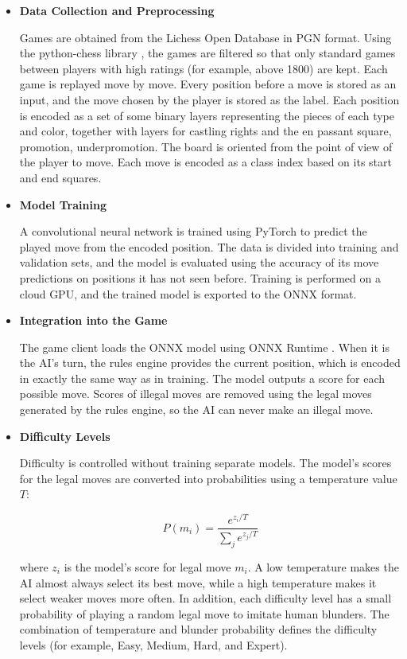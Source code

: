 \begin{itemize}[leftmargin=1.5em]
\item\textbf{Data Collection and Preprocessing}

Games are obtained from the Lichess Open Database in PGN format. Using the python-chess library \cite{pythonchess}, the games are filtered so that only standard games between players with high ratings (for example, above 1800) are kept. Each game is replayed move by move. Every position before a move is stored as an input, and the move chosen by the player is stored as the label. Each position is encoded as a set of some binary layers representing the pieces of each type and color, together with layers for castling rights and the en passant square, promotion, underpromotion. The board is oriented from the point of view of the player to move. Each move is encoded as a class index based on its start and end squares.

\item\textbf{Model Training}

A convolutional neural network is trained using PyTorch \cite{pytorch} to predict the played move from the encoded position. The data is divided into training and validation sets, and the model is evaluated using the accuracy of its move predictions on positions it has not seen before. Training is performed on a cloud GPU, and the trained model is exported to the ONNX format.

\item\textbf{Integration into the Game}

The game client loads the ONNX model using ONNX Runtime \cite{onnxruntime}. When it is the AI's turn, the rules engine provides the current position, which is encoded in exactly the same way as in training. The model outputs a score for each possible move. Scores of illegal moves are removed using the legal moves generated by the rules engine, so the AI can never make an illegal move.

\item\textbf{Difficulty Levels}

Difficulty is controlled without training separate models. The model's scores for the legal moves are converted into probabilities using a temperature value $T$:

\begin{equation}
P(m_i) = \frac{e^{z_i / T}}{\sum_j e^{z_j / T}}
\end{equation}

where $z_i$ is the model's score for legal move $m_i$. A low temperature makes the AI almost always select its best move, while a high temperature makes it select weaker moves more often. In addition, each difficulty level has a small probability of playing a random legal move to imitate human blunders. The combination of temperature and blunder probability defines the difficulty levels (for example, Easy, Medium, Hard, and Expert).
\end{itemize}


